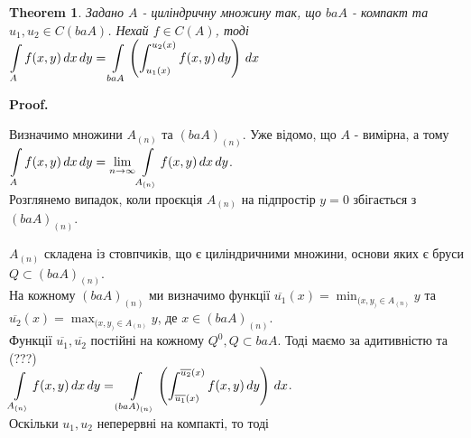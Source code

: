 \documentclass[a4paper, 10pt]{article}
\makeatletter
\def\qed{$\blacksquare$}
\theoremstyle{theoremdd}
\newtheorem{theorem}{Theorem}[subsection]
\theoremstyle{theoremdd}
\theoremstyle{theoremdd}
\theoremstyle{theoremdd}
\theoremstyle{theoremdd}
\theoremstyle{theoremdd}
\theoremstyle{theoremdd}
\theoremstyle{theoremdd}
\renewenvironment{proof}[1][Proof.\\]{\par
\pushQED{\hfill \qed}%
\normalfont \topsep6\p@\@plus6\p@\relax
\trivlist
\item\relax
{\bfseries
#1\@addpunct{.}}\hspace\labelsep\ignorespaces
}{%
\popQED\endtrivlist\@endpefalse
}
\makeatother
\begin{document}
\begin{theorem}
Задано $A$ - циліндричну множину так, що $baA$ - компакт та $u_1,u_2 \in C(baA)$. Нехай $f \in C(A)$, тоді\\
$\displaystyle\int\displaylimits_A f(x,y)\,dx\,dy = \int\displaylimits_{baA} \left( \int_{u_1(x)}^{u_2(x)} f(x,y)\,dy \right)\,dx$
\end{theorem}

\begin{proof}
Визначимо множини $A_{(n)}$ та $(baA)_{(n)}$. Уже відомо, що $A$ - вимірна, а тому\\
$\displaystyle\int\displaylimits_A f(x,y)\,dx\,dy = \lim_{n \to \infty} \int\displaylimits_{A_{(n)}}f(x,y)\,dx\,dy$.\\
Розглянемо випадок, коли проєкція $A_{(n)}$ на підпростір $y = 0$ збігається з $(baA)_{(n)}$.
\begin{figure}[H]
\centering
{}
\end{figure}
$A_{(n)}$ складена із стовпчиків, що є циліндричними множини, основи яких є бруси $Q \subset (baA)_{(n)}$.\\
На кожному $(baA)_{(n)}$ ми визначимо функції $\overline{u_1}(x) = \displaystyle\min_{(x,y_) \in A_{(n)}} y$ та $\overline{u_2}(x) = \displaystyle\max_{(x,y_) \in A_{(n)}} y$, де $x \in (baA)_{(n)}$.\\
Функції $\overline{u_1}, \overline{u_2}$ постійні на кожному $Q^0, Q \subset baA$. Тоді маємо за адитивністю та (???)\\
$\displaystyle\int\displaylimits_{A_{(n)}} f(x,y)\,dx\,dy = \int\displaylimits_{(baA)_{(n)}} \left(\int_{\overline{u_1}(x)}^{\overline{u_2}(x)} f(x,y)\,dy \right)\,dx$.\\
Оскільки $u_1,u_2$ неперервні на компакті, то тоді\\

\end{proof}
\end{document}
